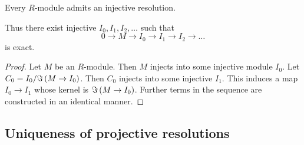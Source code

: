 \begin{proposition}
Every $ R $-module admits an injective resolution.
\end{proposition}

Thus there exist injective $ I_0, I_1, I_2, \dots $ such that
$$ 0 \to M \to I_0 \to I_1 \to I_2 \to \dots $$
is exact.

\begin{proof}
Let $ M $ be an $ R $-module. Then $ M $ injects into some injective module $ I_0 $. Let $ C_0 = I_0 / \Im \br{M \to I_0} $. Then $ C_0 $ injects into some injective $ I_1 $. This induces a map $ I_0 \to I_1 $ whose kernel is $ \Im \br{M \to I_0} $. Further terms in the sequence are constructed in an identical manner.
\end{proof}

\subsection{Uniqueness of projective resolutions}

